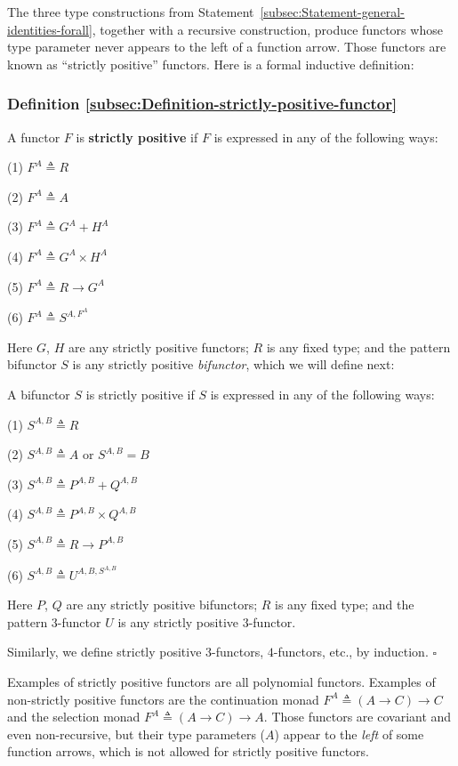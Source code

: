 The three type constructions from Statement~\ref{subsec:Statement-general-identities-forall},
together with a recursive construction, produce functors whose type
parameter never appears to the left of a function arrow. Those functors
are known as \textsf{``}strictly positive\textsf{''} functors. Here is a formal inductive
definition:

\subsubsection{Definition \label{subsec:Definition-strictly-positive-functor}\ref{subsec:Definition-strictly-positive-functor}}

A functor $F$ is  \textbf{strictly
positive} if $F$ is expressed in any of the following ways:

(1) $F^{A}\triangleq R$

(2) $F^{A}\triangleq A$

(3) $F^{A}\triangleq G^{A}+H^{A}$

(4) $F^{A}\triangleq G^{A}\times H^{A}$

(5) $F^{A}\triangleq R\rightarrow G^{A}$

(6) $F^{A}\triangleq S^{A,F^{A}}$

Here $G$, $H$ are any strictly positive functors; $R$ is any fixed
type; and the pattern bifunctor $S$ is any strictly positive \emph{bifunctor},
which we will define next:

A bifunctor $S$ is strictly positive if $S$ is expressed in any
of the following ways:

(1) $S^{A,B}\triangleq R$

(2) $S^{A,B}\triangleq A$ or $S^{A,B}=B$

(3) $S^{A,B}\triangleq P^{A,B}+Q^{A,B}$

(4) $S^{A,B}\triangleq P^{A,B}\times Q^{A,B}$

(5) $S^{A,B}\triangleq R\rightarrow P^{A,B}$

(6) $S^{A,B}\triangleq U^{A,B,S^{A,B}}$

Here $P$, $Q$ are any strictly positive bifunctors; $R$ is any
fixed type; and the pattern $3$-functor $U$ is any strictly positive
$3$-functor.

Similarly, we define strictly positive $3$-functors, $4$-functors,
etc., by induction. $\square$

Examples of strictly positive functors are all polynomial functors.
Examples of non-strictly positive functors are the continuation monad
$F^{A}\triangleq(A\rightarrow C)\rightarrow C$ and the selection
monad $F^{A}\triangleq(A\rightarrow C)\rightarrow A$. Those functors
are covariant and even non-recursive, but their type parameters ($A$)
appear to the \emph{left} of some function arrows, which is not allowed
for strictly positive functors.

